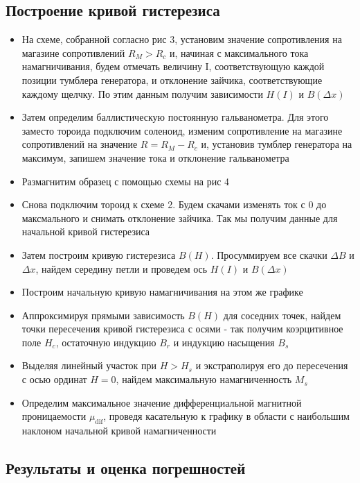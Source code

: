 \documentclass[a4paper, 12pt]{article}
\begin{document}
\subsection{Построение кривой гистерезиса}
\begin{itemize}
    \item На схеме, собранной согласно рис 3, установим значение сопротивления на магазине сопротивлений $R_{M} > R_{c}$ и, начиная с максимального тока намагничивания, будем отмечать величину I, соответствующую каждой позиции тумблера генератора, и отклонение зайчика, соответствующие каждому щелчку. По этим данным получим зависимости $H(I)$ и $B(\Delta x)$
    \item Затем определим баллистическую постоянную гальванометра. Для этого заместо тороида подключим соленоид, изменим сопротивление на магазине сопротивлений на значение $R = R_{M} - R_{c}$ и, установив тумблер генератора на максимум, запишем значение тока и отклонение гальванометра
    \item Размагнитим образец с помощью схемы на рис 4
    \item Снова подключим тороид к схеме 2. Будем скачами изменять ток с 0 до максмального и снимать отклонение зайчика. Так мы получим данные для начальной кривой гистерезиса
    \item Затем построим кривую гистерезиса $B(H)$. Просуммируем все скачки $\Delta B$ и $\Delta x$, найдем середину петли и проведем ось $H(I)$ и $B(\Delta x)$
    \item Построим начальную кривую намагничивания на этом же графике
    \item Аппроксимируя прямыми зависимость $B(H)$ для соседних точек, найдем точки пересечения кривой гистерезиса с осями - так получим коэрцитивное поле $H_{c}$, остаточную индукцию $B_{r}$ и индукцию насыщения $B_{s}$
    \item Выделяя линейный участок при $H > H_{s}$ и экстраполируя его до пересечения с осью ординат $H = 0$, найдем максимальную намагниченность $M_{s}$
    \item Определим максимальное значение дифференциальной магнитной проницаемости $\mu_\text{dif}$, проведя касательную к графику в области с наибольшим наклоном начальной кривой намагниченности
\end{itemize}

\subsection{Результаты и оценка погрешностей}
\end{document}
